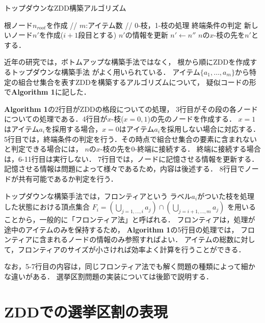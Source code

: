 \begin{algorithm}
  \caption{トップダウンなZDD構築アルゴリズム}
  \label{zdd_topdown}
  \begin{algorithmic}[1]
    \State 根ノード$n_{root}$を作成
     // $m$:アイテム数
       // 0-枝，1-枝の処理
        \State 終端条件の判定
        \State 新しいノード$n'$を作成($i+1$段目とする)
        \State $n'$の情報を更新
          \State $n' \gets n''$
        \EndIf
        \State $n$の$x$-枝の先を$n'$とする．
        \EndFor
      \EndFor
    \EndFor
  \end{algorithmic}
\end{algorithm}

近年の研究では，ボトムアップな構築手法ではなく，
根から順にZDDを作成するトップダウンな構築手法\cite{minato_or}\cite{sekine}
がよく用いられている．
アイテム$\{a_1,\ldots	,a_m\}$から特定の組合せ集合を表すZDDを構築するアルゴリズムについて，
疑似コードの形で\textbf{Algorithm 1}に記した．

\textbf{Algorithm 1}の2行目がZDDの格段についての処理，
3行目がその段の各ノードについての処理である．4行目が$x$-枝($x=0,1$)の先のノードを作成する．
$x=1$はアイテム$a_i$を採用する場合，$x=0$はアイテム$a_i$を採用しない場合に対応する．
5行目では，終端条件の判定を行う．その時点で組合せ集合の要素に含まれないと判定できる場合には，
$n$の$x$-枝の先を0-終端に接続する．
終端に接続する場合は，6-11行目は実行しない．
7行目では，ノードに記憶させる情報を更新する．
記憶させる情報は問題によって様々であるため，内容は後述する．
8行目でノードが共有可能であるか判定を行う．

トップダウンな構築手法では，フロンティアという
ラベル$a_i$がついた枝を処理した状態における頂点集合
$F_i=(\bigcup_{j=1,\ldots ,i}a_j)\cap (\bigcup_{j=i+1, \ldots, m} a_j)$
を用いることから，一般的に「フロンティア法」と呼ばれる．
フロンティアは，処理が途中のアイテムのみを保持するため，
\textbf{Algorithm 1}の5行目の処理では，
フロンティアに含まれるノードの情報のみ参照すればよい．
アイテムの総数に対して，フロンティアのサイズが小さければ効率よく計算を行うことができる．

なお，5-7行目の内容は，同じフロンティア法でも解く問題の種類によって細かな違いがある．
選挙区割問題の実装については後節で説明する．

\section{ZDDでの選挙区割の表現}

